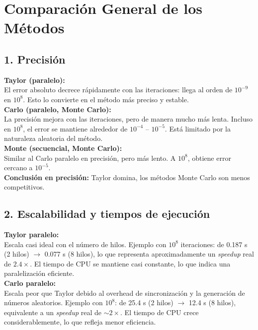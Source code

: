 \documentclass[a4paper,12pt]{article}
\begin{document}
\newpage

\section*{Comparación General de los Métodos}

\subsection*{1. Precisión}

\textbf{Taylor (paralelo):} \\
El error absoluto decrece rápidamente con las iteraciones: llega al orden de $10^{-9}$ en $10^{8}$. 
Esto lo convierte en el método más preciso y estable. \\

\textbf{Carlo (paralelo, Monte Carlo):} \\
La precisión mejora con las iteraciones, pero de manera mucho más lenta. 
Incluso en $10^{8}$, el error se mantiene alrededor de $10^{-4}$ -- $10^{-5}$. 
Está limitado por la naturaleza aleatoria del método. \\

\textbf{Monte (secuencial, Monte Carlo):} \\
Similar al Carlo paralelo en precisión, pero más lento. 
A $10^{8}$, obtiene error cercano a $10^{-5}$. \\

\textbf{Conclusión en precisión:} Taylor domina, los métodos Monte Carlo son menos competitivos. 

\subsection*{2. Escalabilidad y tiempos de ejecución}

\textbf{Taylor paralelo:} \\
Escala casi ideal con el número de hilos. 
Ejemplo con $10^{8}$ iteraciones: de 0.187 s (2 hilos) $\rightarrow$ 0.077 s (8 hilos), 
lo que representa aproximadamente un \textit{speedup} real de $2.4\times$. 
El tiempo de CPU se mantiene casi constante, lo que indica una paralelización eficiente. \\

\textbf{Carlo paralelo:} \\
Escala peor que Taylor debido al overhead de sincronización y la generación de números aleatorios. 
Ejemplo con $10^{8}$: de 25.4 s (2 hilos) $\rightarrow$ 12.4 s (8 hilos), 
equivalente a un \textit{speedup} real de $\sim 2\times$. 
El tiempo de CPU crece considerablemente, lo que refleja menor eficiencia. \\
\end{document}

